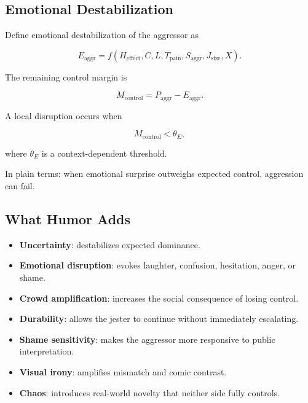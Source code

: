 \documentclass[11pt]{article}
\begin{document}
\subsection{Emotional Destabilization}

Define emotional destabilization of the aggressor as

\begin{equation}
E_{\mathrm{aggr}}
=
f\!\left(
H_{\mathrm{effect}},
C,
L,
T_{\mathrm{pain}},
S_{\mathrm{aggr}},
J_{\mathrm{size}},
X
\right).
\label{eq:e-aggr}
\end{equation}

The remaining control margin is

\begin{equation}
M_{\mathrm{control}}
=
P_{\mathrm{aggr}}-E_{\mathrm{aggr}}.
\label{eq:control-margin}
\end{equation}

A local disruption occurs when

\begin{equation}
M_{\mathrm{control}}<\theta_E,
\label{eq:success-threshold}
\end{equation}

where $\theta_E$ is a context-dependent threshold.

In plain terms: when emotional surprise outweighs expected control, aggression can fail.

\subsection{What Humor Adds}

\begin{itemize}
\item \textbf{Uncertainty}: destabilizes expected dominance.
\item \textbf{Emotional disruption}: evokes laughter, confusion, hesitation, anger, or shame.
\item \textbf{Crowd amplification}: increases the social consequence of losing control.
\item \textbf{Durability}: allows the jester to continue without immediately escalating.
\item \textbf{Shame sensitivity}: makes the aggressor more responsive to public interpretation.
\item \textbf{Visual irony}: amplifies mismatch and comic contrast.
\item \textbf{Chaos}: introduces real-world novelty that neither side fully controls.
\end{itemize}
\end{document}
